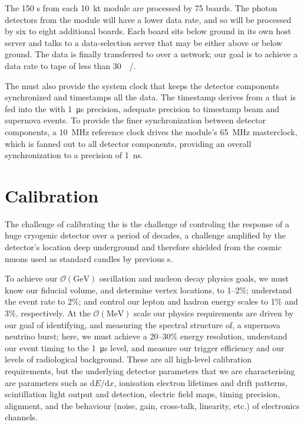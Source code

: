 The 150 s from each \SI{10}{\kilo\tonne} module are processed by 75  boards. The photon detectors from the module will have a lower data rate, and so will be processed by six to eight additional  boards. Each  board sits below ground in its own host server and talks to a data-selection server that may be either above or below ground. The data is finally transferred to  over a network; our goal is to achieve a data rate to tape of less than \SI{30}{\peta\byte/\year}.

The  must also provide the system clock that keeps the detector components synchronized and timestamps all the data. The timestamp derives from a   that is fed into the  with \SI{1}{\micro\second} precision, adequate precision to timestamp beam and supernova events. To provide the finer synchronization between detector components, a \SI{10}{\mega\hertz} reference clock drives the module's \SI{65}{\mega\hertz} masterclock, which is fanned out to all detector components, providing an overall synchronization to a precision of \SI{1}{\nano\second}.

\section{Calibration}
\label{sec:fdsp-exec-calibration}

The challenge of calibrating the   is the challenge of controling the response of a huge cryogenic detector over a period of decades, a challenge amplified by the detector's location deep underground and therefore shielded from the cosmic muons used as standard candles by previous s.

To achieve our $\mathcal{O}(\si{\giga\electronvolt})$ oscillation and nucleon decay physics goals, we must know our fiducial volume, and determine vertex locations, to 1--2\%; understand the \nue event rate to 2\%; and control our lepton and hadron energy scales to 1\% and 3\%, respectively. At the $\mathcal{O}(\si{\mega\electronvolt})$ scale our physics requirements are driven by our goal of identifying, and measuring the spectral structure of, a supernova neutrino burst; here, we must achieve a 20--30\% energy resolution, understand our event timing to the \SI{1}{\micro\second} level, and measure our trigger efficiency and our levels of radiological background. These are all high-level calibration requirements, but the underlying detector parameters that we are characterising are parameters such as $\mathrm{d}E/\mathrm{d}x$, ionisation electron lifetimes and drift patterns, scintillation light output and detection, electric field maps, timing precision,  alignment, and the behaviour (noise, gain, cross-talk, linearity, etc.) of electronics channels.

